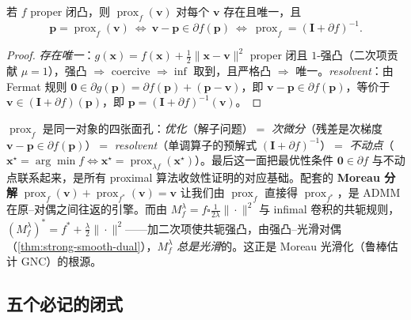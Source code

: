 \begin{theorem}\label{thm:prox-resolvent}
若 $f$ proper 闭凸，则 $\operatorname{prox}_f(\mathbf v)$ 对每个 $\mathbf v$ 存在且唯一，且
\begin{equation}
  \mathbf p=\operatorname{prox}_f(\mathbf v)\ \Longleftrightarrow\ \mathbf v-\mathbf p\in\partial f(\mathbf p)\ \Longleftrightarrow\ \operatorname{prox}_f=(\mathbf I+\partial f)^{-1}.
  \label{eq:prox-resolvent}
\end{equation}
\end{theorem}
\begin{proof}
\emph{存在唯一}：$g(\mathbf x)=f(\mathbf x)+\tfrac12\|\mathbf x-\mathbf v\|^2$ proper 闭且 $1$-强凸（二次项贡献 $\mu=1$），强凸 $\Rightarrow$ coercive $\Rightarrow\inf$ 取到，且严格凸 $\Rightarrow$ 唯一。\emph{resolvent}：由 Fermat 规则 $\mathbf 0\in\partial g(\mathbf p)=\partial f(\mathbf p)+(\mathbf p-\mathbf v)$，即 $\mathbf v-\mathbf p\in\partial f(\mathbf p)$，等价于 $\mathbf v\in(\mathbf I+\partial f)(\mathbf p)$，即 $\mathbf p=(\mathbf I+\partial f)^{-1}(\mathbf v)$。
\end{proof}

\begin{insight}\label{ins:prox-faces}
$\operatorname{prox}_f$ 是同一对象的四张面孔：\emph{优化}（解子问题）$=$ \emph{次微分}（残差是次梯度 $\mathbf v-\mathbf p\in\partial f(\mathbf p)$）$=$ \emph{resolvent}（单调算子的预解式 $(\mathbf I+\partial f)^{-1}$）$=$ \emph{不动点}（$\mathbf x^\star=\arg\min f\iff\mathbf x^\star=\operatorname{prox}_{\lambda f}(\mathbf x^\star)$）。最后这一面把最优性条件 $\mathbf 0\in\partial f$ 与不动点联系起来，是所有 proximal 算法收敛性证明的对应基础。配套的 \textbf{Moreau 分解} $\operatorname{prox}_f(\mathbf v)+\operatorname{prox}_{f^\ast}(\mathbf v)=\mathbf v$ 让我们由 $\operatorname{prox}_f$ 直接得 $\operatorname{prox}_{f^\ast}$，是 ADMM 在原--对偶之间往返的引擎。而由 $M_f^\lambda=f\square\tfrac1{2\lambda}\|\cdot\|^2$ 与 infimal 卷积的共轭规则，$(M_f^\lambda)^\ast=f^\ast+\tfrac\lambda2\|\cdot\|^2$——加二次项使共轭强凸，由强凸--光滑对偶（\cref{thm:strong-smooth-dual}），$M_f^\lambda$ \emph{总是光滑}的。这正是 Moreau 光滑化（鲁棒估计 GNC）的根源。
\end{insight}

\subsection{五个必记的闭式}
\label{subsec:cvx-prox-closed}

